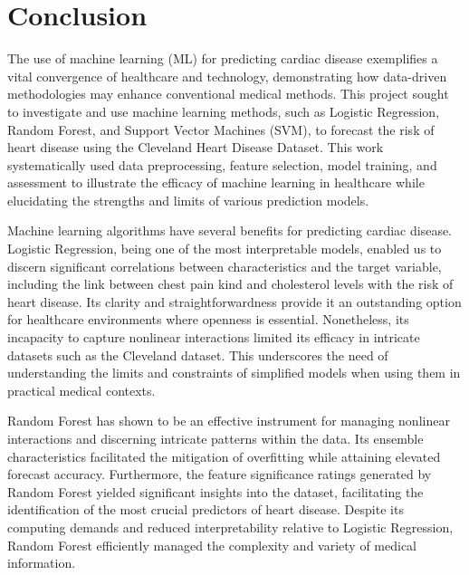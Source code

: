 \section{Conclusion}

The use of machine learning (ML) for predicting cardiac disease exemplifies a vital convergence of healthcare and technology, demonstrating how data-driven methodologies may enhance conventional medical methods. This project sought to investigate and use machine learning methods, such as Logistic Regression, Random Forest, and Support Vector Machines (SVM), to forecast the risk of heart disease using the Cleveland Heart Disease Dataset. This work systematically used data preprocessing, feature selection, model training, and assessment to illustrate the efficacy of machine learning in healthcare while elucidating the strengths and limits of various prediction models.

Machine learning algorithms have several benefits for predicting cardiac disease. Logistic Regression, being one of the most interpretable models, enabled us to discern significant correlations between characteristics and the target variable, including the link between chest pain kind and cholesterol levels with the risk of heart disease. Its clarity and straightforwardness provide it an outstanding option for healthcare environments where openness is essential. Nonetheless, its incapacity to capture nonlinear interactions limited its efficacy in intricate datasets such as the Cleveland dataset. This underscores the need of understanding the limits and constraints of simplified models when using them in practical medical contexts.

Random Forest has shown to be an effective instrument for managing nonlinear interactions and discerning intricate patterns within the data. Its ensemble characteristics facilitated the mitigation of overfitting while attaining elevated forecast accuracy. Furthermore, the feature significance ratings generated by Random Forest yielded significant insights into the dataset, facilitating the identification of the most crucial predictors of heart disease. Despite its computing demands and reduced interpretability relative to Logistic Regression, Random Forest efficiently managed the complexity and variety of medical information.

